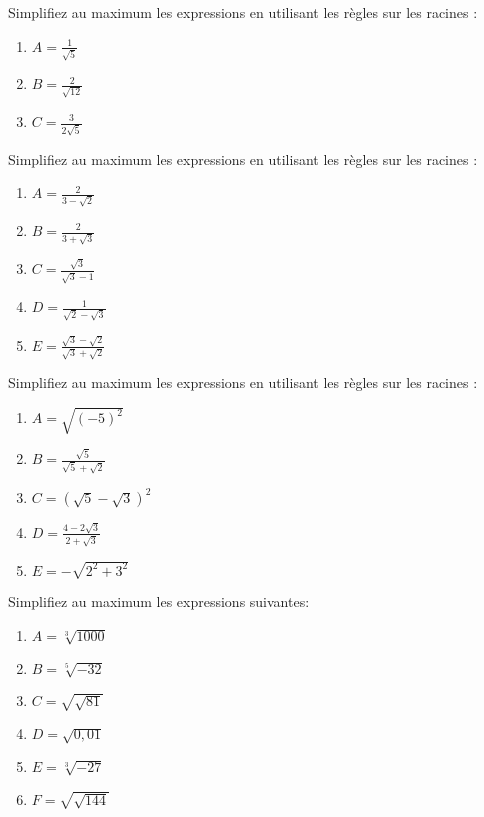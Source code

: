 \begin{exercice}
Simplifiez au maximum les expressions en utilisant les règles sur les racines :
\begin{multicols}{2}
\begin{enumerate}
\item $A=\displaystyle\frac{1}{\sqrt{5}}$
\item $B=\displaystyle\frac{2}{\sqrt{12}}$
\item $C=\displaystyle\frac{3}{2\sqrt{5}}$
\end{enumerate}
\end{multicols}
\end{exercice}

\begin{exercice}
Simplifiez au maximum les expressions en utilisant les règles sur les racines :
\begin{multicols}{2}
\begin{enumerate}
\item $A=\displaystyle\frac{2}{3-\sqrt{2}}$
\item $B=\displaystyle\frac{2}{3+\sqrt{3}}$
\item $C=\displaystyle\frac{\sqrt{3}}{\sqrt{3}-1}$
\item $D=\displaystyle\frac{1}{\sqrt{2}-\sqrt{3}}$
\item $E=\displaystyle\frac{\sqrt{3}-\sqrt{2}}{\sqrt{3}+\sqrt{2}}$
\end{enumerate}
\end{multicols}
\end{exercice}



\begin{exercice}
Simplifiez au maximum les expressions en utilisant les règles sur les racines :
\begin{multicols}{2}
\begin{enumerate}
\item $A=\sqrt{(-5)^2}$
\item $B=\displaystyle\frac{\sqrt{5}}{\sqrt{5}+\sqrt{2}}$
\item $C=(\sqrt{5}-\sqrt{3})^2$
\item $D=\displaystyle\frac{4-2\sqrt{3}}{{2+\sqrt{3}}}$
\item $E=-\sqrt{2^2+3^2}$
\end{enumerate}
\end{multicols}
\end{exercice}

\begin{exercice}
Simplifiez au maximum les expressions suivantes:
\begin{multicols}{2}
\begin{enumerate}
\item $A=\sqrt[3]{1000}$
\item $B=\sqrt[5]{-32}$
\item $C=\sqrt{\sqrt{81}}$
\item $D=\sqrt{0,01}$
\item $E=\sqrt[3]{-27}$
\item $F=\sqrt{\sqrt{144}}$
\end{enumerate}
\end{multicols}
\end{exercice}

